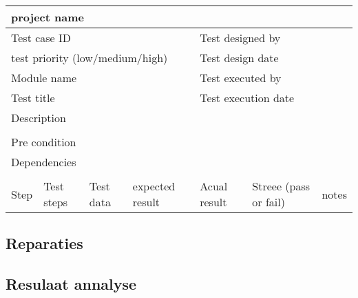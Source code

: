 			\begin{tabular}{|l|l|l|l|l|l|l|} \hline
				\multicolumn{7}{|l|}{project name}                                                               \\ \hline
				\multicolumn{4}{|l|}{Test case ID}   &\multicolumn{3}{|l|}{Test designed by}                           \\ \hline
				\multicolumn{4}{|l|}{test priority (low/medium/high)}   &\multicolumn{3}{|l|}{Test design date}                           \\ \hline
				\multicolumn{4}{|l|}{Module name}   &\multicolumn{3}{|l|}{Test executed by}                           \\ \hline
				\multicolumn{4}{|l|}{Test title}   &\multicolumn{3}{|l|}{Test execution date}                           \\ \hline
				\multicolumn{4}{|l|}{Description}   &\multicolumn{3}{|l|}{ }                           \\ \hline 		
				\multicolumn{7}{|l|}{ }   																\\ \hline
				\multicolumn{7}{|l|}{Pre condition}                                                               \\ \hline
				\multicolumn{7}{|l|}{Dependencies}                                                               \\ \hline
				\multicolumn{7}{|l|}{ }   															\\ \hline
				Step  &  Test steps & Test data & expected result &Acual result &Streee (pass or fail)&notes  \\ \hline
				
			\end{tabular}
			
			
			
			
			
			
			
			\subsection{Reparaties}
			
			\subsection{Resulaat annalyse}
			
			\lipsum[2-4]
			\begin{figure}[t]
				\centering
				\hfil
				
				\hfil
				\caption{}
				
				
				\label{fig: 2.2}
			\end{figure}
			
